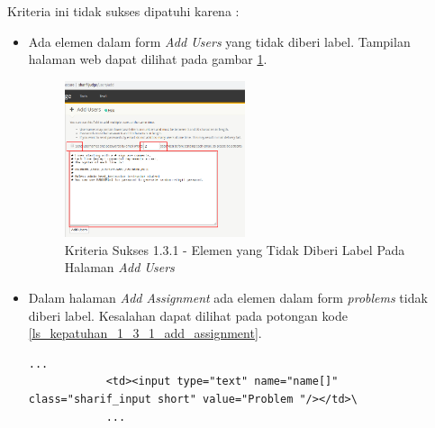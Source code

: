 \documentclass[a4paper,twoside]{article}
\begin{document}
\begin{enumerate}
		Kriteria ini tidak sukses dipatuhi karena :
		\begin{itemize}
			\item Ada elemen dalam form \textit{Add Users} yang tidak diberi label. Tampilan halaman web dapat dilihat pada gambar \ref{fig:kepatuhan_1_3_1_add_user}.
			\begin{figure}[H]
				\centering  
				\includegraphics[width=0.5\textwidth]{kepatuhan_1_3_1_add_user}  
				\caption[Kriteria Sukses 1.3.1 - Elemen yang Tidak Diberi Label Pada Halaman \textit{Add Users}]{Kriteria Sukses 1.3.1 - Elemen yang Tidak Diberi Label Pada Halaman \textit{Add Users}} 
				\label{fig:kepatuhan_1_3_1_add_user} 
			\end{figure}
			\item Dalam halaman \textit{Add Assignment} ada elemen dalam form \textit{problems} tidak diberi label. Kesalahan dapat dilihat pada potongan kode \ref{ls_kepatuhan_1_3_1_add_assignment}.
			\begin{lstlisting}[basicstyle=\ttfamily, frame=single,
			columns=fullflexible, keepspaces=true, breaklines=true, label=ls_kepatuhan_1_3_1_add_assignment, caption=Kriteria Sukses 1.3.1 - Elemen Dalam Form yang Tidak Diberi Label]
			...
			<td><input type="text" name="name[]" class="sharif_input short" value="Problem "/></td>\
			...
			\end{lstlisting}
			

\end{itemize}
\end{enumerate}
\end{document}
